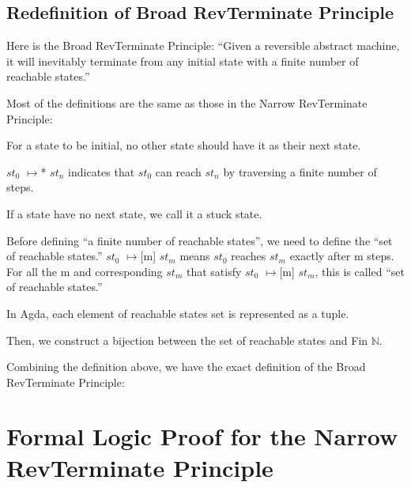 

\subsection{ Redefinition of Broad RevTerminate Principle }
Here is the Broad RevTerminate Principle:
``Given a reversible abstract machine, it will inevitably terminate from any initial state with a finite number of reachable states.''

Most of the definitions are the same as those in the Narrow RevTerminate Principle:

For a state to be initial, no other state should have it as their next state.



$st_{0}$ $\mapsto$* $st_{n}$ indicates that $st_{0}$ can reach $st_{n}$ by traversing a finite number of steps.



If a state have no next state, we call it a stuck state.



Before defining ``a finite number of reachable states'', we need to define the ``set of reachable states.''
$st_{0}$ $\mapsto$[m] $st_{m}$ means $st_{0}$ reaches $st_{m}$ exactly after m steps.
For all the m and corresponding $st_{m}$ that satisfy $st_{0}$ $\mapsto$[m] $st_{m}$, this is called ``set of reachable states.''



In Agda, each element of reachable states set is represented as a tuple. 



Then, we construct a bijection between the set of reachable states and Fin $\mathbb{N}$.



Combining the definition above, we have the exact definition of the Broad RevTerminate Principle:



\section{Formal Logic Proof for the Narrow RevTerminate Principle}

